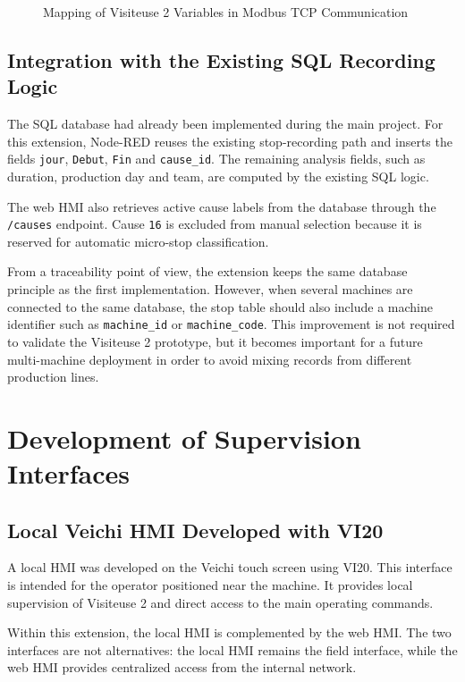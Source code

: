\begin{figure}[H]
\centering
{}
\caption{Mapping of Visiteuse 2 Variables in Modbus TCP Communication}
\label{fig:chapter4-7}
\end{figure}

\subsection{Integration with the Existing SQL Recording Logic}
The SQL database had already been implemented during the main project. For this extension, Node-RED reuses the existing stop-recording path and inserts the fields \texttt{jour}, \texttt{Debut}, \texttt{Fin} and \texttt{cause\_id}. The remaining analysis fields, such as duration, production day and team, are computed by the existing SQL logic.

The web HMI also retrieves active cause labels from the database through the \texttt{/causes} endpoint. Cause \texttt{16} is excluded from manual selection because it is reserved for automatic micro-stop classification.


From a traceability point of view, the extension keeps the same database principle as the first implementation. However, when several machines are connected to the same database, the stop table should also include a machine identifier such as \texttt{machine\_id} or \texttt{machine\_code}. This improvement is not required to validate the Visiteuse 2 prototype, but it becomes important for a future multi-machine deployment in order to avoid mixing records from different production lines.

\section{Development of Supervision Interfaces}

\subsection{Local Veichi HMI Developed with VI20}
A local HMI was developed on the Veichi touch screen using VI20. This interface is intended for the operator positioned near the machine. It provides local supervision of Visiteuse 2 and direct access to the main operating commands.

Within this extension, the local HMI is complemented by the web HMI. The two interfaces are not alternatives: the local HMI remains the field interface, while the web HMI provides centralized access from the internal network.

